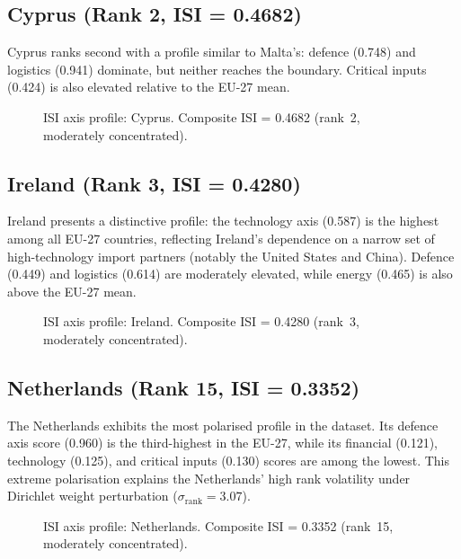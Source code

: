 \subsection{Cyprus (Rank 2, ISI = 0.4682)}

Cyprus ranks second with a profile similar to Malta's: defence
(0.748) and logistics (0.941) dominate, but neither reaches the
boundary.  Critical inputs (0.424) is also elevated relative to
the EU-27 mean.

\begin{figure}[htbp]
\centering

\caption{ISI axis profile: Cyprus.  Composite ISI = 0.4682 (rank~2,
  moderately concentrated).}
\label{fig:radar-CY}
\end{figure}

\subsection{Ireland (Rank 3, ISI = 0.4280)}

Ireland presents a distinctive profile: the technology axis (0.587)
is the highest among all EU-27 countries, reflecting Ireland's
dependence on a narrow set of high-technology import partners
(notably the United States and China).  Defence (0.449) and
logistics (0.614) are moderately elevated, while energy (0.465) is
also above the EU-27 mean.

\begin{figure}[htbp]
\centering

\caption{ISI axis profile: Ireland.  Composite ISI = 0.4280 (rank~3,
  moderately concentrated).}
\label{fig:radar-IE}
\end{figure}

\subsection{Netherlands (Rank 15, ISI = 0.3352)}

The Netherlands exhibits the most polarised profile in the dataset.
Its defence axis score (0.960) is the third-highest in the EU-27,
while its financial (0.121), technology (0.125), and critical inputs
(0.130) scores are among the lowest.  This extreme polarisation
explains the Netherlands' high rank volatility under Dirichlet
weight perturbation ($\sigma_{\text{rank}} = 3.07$).

\begin{figure}[htbp]
\centering

\caption{ISI axis profile: Netherlands.  Composite ISI = 0.3352
  (rank~15, moderately concentrated).}
\label{fig:radar-NL}
\end{figure}


